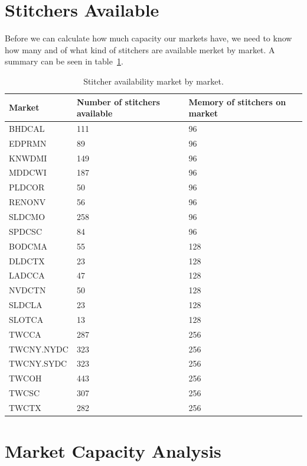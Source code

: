 \documentclass{article}
\begin{document}
\section{Stitchers Available}

Before we can calculate how much capacity our markets have, we need to know how many and of what kind of stitchers are available merket by market. A summary can be seen in table~\ref{TABLE-marketStitcherAvail}.

\begin{table}
\begin{tabular}{|l|l|l|} 
\hline Market & Number of stitchers available & Memory of stitchers on market \\
\hline BHDCAL & 111 & 96 \\
\hline EDPRMN & 89 & 96 \\
\hline KNWDMI & 149 & 96 \\
\hline MDDCWI & 187 & 96 \\
\hline PLDCOR & 50 & 96 \\
\hline RENONV & 56 & 96 \\
\hline SLDCMO & 258 & 96 \\
\hline SPDCSC & 84 & 96 \\
\hline BODCMA & 55 & 128 \\
\hline DLDCTX & 23 & 128 \\
\hline LADCCA & 47 & 128 \\
\hline NVDCTN & 50 & 128 \\
\hline SLDCLA & 23 & 128 \\
\hline SLOTCA & 13 & 128 \\
\hline TWCCA & 287 & 256 \\
\hline TWCNY.NYDC & 323 & 256 \\
\hline TWCNY.SYDC & 323 & 256 \\
\hline TWCOH & 443 & 256 \\
\hline TWCSC & 307 & 256 \\
\hline TWCTX & 282 & 256 \\
\hline 
\end{tabular}
\caption{\label{TABLE-marketStitcherAvail}Stitcher availability market by market.} 
\end{table}



\section{Market Capacity Analysis}
\end{document}
